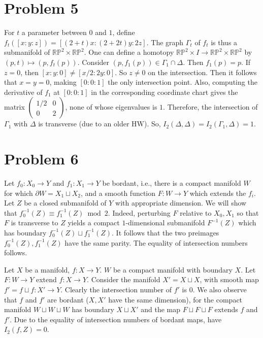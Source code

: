 \documentclass{amsart}
\numberwithin{equation}{section}
\theoremstyle{plain}
\theoremstyle{definition}
\theoremstyle{remark}
\renewcommand{\_}[2]{\underbrace{#1}_{#2}}
\renewcommand{\^}[2]{\overbrace{#1}_{#2}}
\newcommand{\R}{\mathbb{R}}
\renewcommand{\P}{\mathbb{P}}
\begin{document}
\section*{Problem 5}
For $t$ a parameter between $0$ and $1$, define $f_t([x:y:z]) = [(2+t)x: (2+2t)y: 2z].$ The graph $\Gamma_t$ of $f_t$ is thus a submanifold of $\R\P^2 \times \R\P^2$. One can define a homotopy $\R\P^2 \times I \to \R\P^2 \times \R\P^2$ by $(p,t) \mapsto (p,f_t(p))$. Consider $(p,f_1(p)) \in \Gamma_1\cap \Delta$. Then $f_1(p) = p$. If $z = 0$, then $[x:y:0] \neq [x/2:2y:0]$. So $z \neq 0$ on the intersection. Then it follows that $x = y = 0$, making $[0:0:1]$ the only intersection point. Also, computing the derivative of $f_1$ at $[0:0:1]$ in the corresponding coordinate chart gives the matrix $
\begin{pmatrix}
  1/2 & 0 \\ 0 & 2
\end{pmatrix}$, none of whose eigenvalues is $1$. Therefore, the intersection of $\Gamma_1$ with $\Delta$ is transverse (due to an older HW). So, $I_2(\Delta, \Delta) = I_2(\Gamma_1, \Delta) = 1$.

\section*{Problem 6}

Let $f_0:X_0 \to Y$ and $f_1: X_1 \to Y$ be bordant, i.e., there is a compact manifold $W$ for which $\partial W = X_1 \sqcup X_2$, and a smooth function $F: W \to Y$ which extends the $f_i$. Let $Z$ be a closed submanifold of $Y$ with appropriate dimension. We will show that $f_0^{-1}(Z) \equiv f_1^{-1}(Z) \bmod 2$. Indeed, perturbing $F$ relative to $X_0, X_1$ so that $F$ is transverse to $Z$ yields a compact $1$-dimensional submanifold $F^{-1}(Z)$ which has boundary $f_0^{-1}(Z) \sqcup f_1^{-1}(Z)$. It follows that the two preimages $f_0^{-1}(Z), f_1^{-1}(Z)$ have the same parity. The equality of intersection numbers follows.

Let $X$ be a manifold, $f:X\to Y$. $W$ be a compact manifold with boundary $X$. Let $F:W \to Y$ extend $f:X\to Y$. Consider the manifold $X' = X\sqcup X$, with smooth map $f' = f\sqcup f : X' \to Y$. Clearly the intersection number of $f'$ is $0$. We also observe that $f$ and $f'$ are bordant ($X, X'$ have the same dimension), for the compact manifold $W\sqcup W \sqcup W$ has boundary $X\sqcup X'$ and the map $F\sqcup F\sqcup F$ extends $f$ and $f'$. Due to the equality of intersection numbers of bordant maps, have $I_2(f,Z) = 0$.
\end{document}
